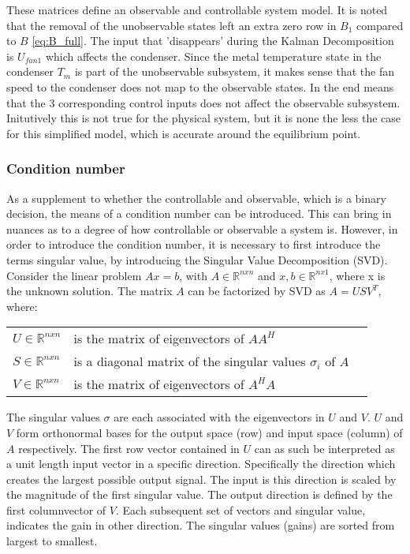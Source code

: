 These matrices define an observable and controllable system model. It is noted that the removal of the unobservable states left an extra zero row in $B_1$ compared to $ B $ \cref{eq:B_full}. The input that 'disappears' during the Kalman Decomposition is $ U_{fan1} $ which affects the condenser. Since the metal temperature state in the condenser $ T_m $ is part of the unobservable subsystem, it makes sense that the fan speed to the condenser does not map to the observable states. 
In the end means that the 3 corresponding control inputs does not affect the observable subsystem. Initutively this is not true for the physical system, but it is none the less the case for this simplified model, which is accurate around the equilibrium point.

\subsubsection{Condition number} \label{sec:condNumber}
As a supplement to whether the controllable and observable, which is a binary decision, the means of a condition number can be introduced. This can bring in nuances as to a degree of how controllable or observable a system is. However, in order to introduce the condition number, it is necessary to first introduce the terms singular value, by introducing the Singular Value Decomposition (SVD).\\
 
Consider the linear problem $Ax=b$, with $A \in \mathbb{R} ^{n x n}$ and $ x, b \in \mathbb{R} ^{n x 1}$, where x is the unknown solution. The matrix $A$ can be factorized by SVD as $A = USV^T$, where:
\begin{center}
	\begin{tabular}{l p{8cm} l}
		$U \in \mathbb{R} ^{n x n}$		& is the matrix of eigenvectors of $AA^H$  &  \\
		$S \in \mathbb{R} ^{n x n}$ 	& is a diagonal matrix of the singular values $\sigma_i$ of $A$ &  \\
		$V \in \mathbb{R} ^{n x n}$		& is the matrix of eigenvectors of $A^HA$  &  \\
	\end{tabular}
\end{center}

The singular values $\sigma$ are each associated with the eigenvectors in $U$ and $V$. $U$ and $V$ form orthonormal bases for the output space (row) and input space (column) of $A$ respectively. The first row vector contained in $U$ can as such be interpreted as a unit length input vector in a specific direction. Specifically the direction which creates the largest possible output signal. The input is this direction is scaled by the magnitude of the first singular value. The output direction is defined by the first columnvector of $V$. Each subsequent set of vectors and singular value, indicates the gain in other direction. The singular values (gains) are sorted from largest to smallest.

